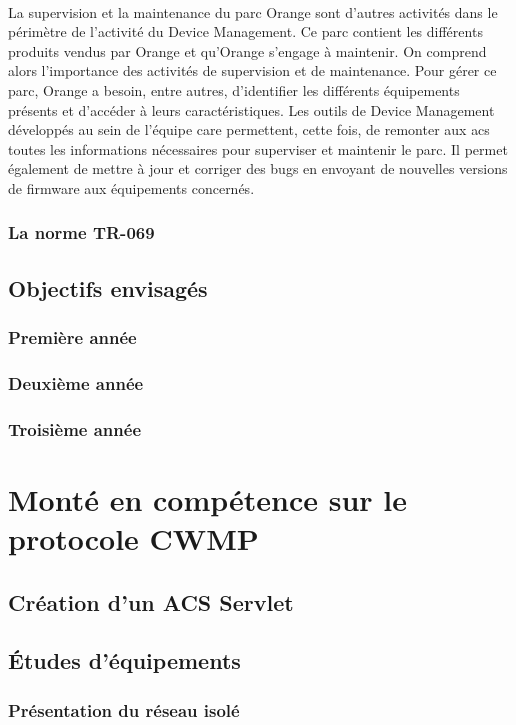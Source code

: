 \documentclass[12pt,a4paper]{report}
\begin{document}
\paragraph*{}
La supervision et la maintenance du parc Orange sont d’autres activités dans le
périmètre de l’activité du Device Management. Ce parc contient les différents produits
vendus par Orange et qu’Orange s’engage à maintenir. On comprend alors l’importance des
activités de supervision et de maintenance. Pour gérer ce parc, Orange a besoin, entre
autres, d’identifier les différents équipements présents et d’accéder à leurs  caractéristiques. Les outils de Device Management développés au sein de l’équipe \gls{care} permettent, cette fois, de remonter aux \gls{acs} toutes les informations nécessaires pour superviser et maintenir le parc. Il permet également de mettre à jour et corriger des bugs en envoyant de nouvelles versions de firmware aux équipements concernés. \\
\subsubsection{La norme TR-069}
\subsection{Objectifs envisagés}
\subsubsection{Première année}
\subsubsection{Deuxième année}
\subsubsection{Troisième année}

\section{Monté en compétence sur le protocole CWMP}
\subsection{Création d'un ACS Servlet}
\subsection{Études d'équipements}
\subsubsection{Présentation du réseau isolé}
\end{document}
